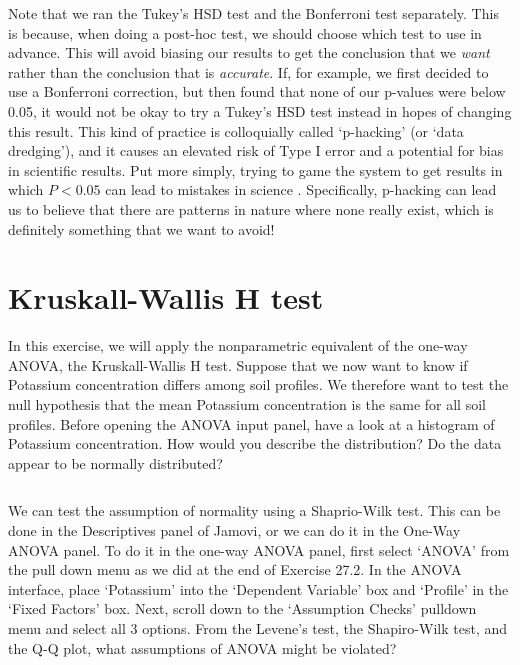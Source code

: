 \documentclass[
]{scrbook}
\begin{document}
\begin{verbatim}

\end{verbatim}

Note that we ran the Tukey's HSD test and the Bonferroni test separately.
This is because, when doing a post-hoc test, we should choose which test to use in advance.
This will avoid biasing our results to get the conclusion that we \emph{want} rather than the conclusion that is \emph{accurate}.
If, for example, we first decided to use a Bonferroni correction, but then found that none of our p-values were below 0.05, it would not be okay to try a Tukey's HSD test instead in hopes of changing this result.
This kind of practice is colloquially called `p-hacking' (or `data dredging'), and it causes an elevated risk of Type I error and a potential for bias in scientific results.
Put more simply, trying to game the system to get results in which \(P < 0.05\) can lead to mistakes in science \citep{Head2015}.
Specifically, p-hacking can lead us to believe that there are patterns in nature where none really exist, which is definitely something that we want to avoid!

\hypertarget{kruskall-wallis-h-test}{%
\section{Kruskall-Wallis H test}\label{kruskall-wallis-h-test}}

In this exercise, we will apply the nonparametric equivalent of the one-way ANOVA, the Kruskall-Wallis H test.
Suppose that we now want to know if Potassium concentration differs among soil profiles.
We therefore want to test the null hypothesis that the mean Potassium concentration is the same for all soil profiles.
Before opening the ANOVA input panel, have a look at a histogram of Potassium concentration.
How would you describe the distribution?
Do the data appear to be normally distributed?

\begin{verbatim}

\end{verbatim}

We can test the assumption of normality using a Shaprio-Wilk test.
This can be done in the Descriptives panel of Jamovi, or we can do it in the One-Way ANOVA panel.
To do it in the one-way ANOVA panel, first select `ANOVA' from the pull down menu as we did at the end of Exercise 27.2.
In the ANOVA interface, place `Potassium' into the `Dependent Variable' box and `Profile' in the `Fixed Factors' box.
Next, scroll down to the `Assumption Checks' pulldown menu and select all 3 options.
From the Levene's test, the Shapiro-Wilk test, and the Q-Q plot, what assumptions of ANOVA might be violated?
\end{document}
